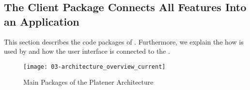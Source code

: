 \documentclass[../ClassicThesis.tex]{subfiles}
\begin{document}





\subsection{The Client Package Connects All Features Into an
  Application}
\label{sec:client-to-application}


This section describes the code packages of {\platener}.
Furthermore, we explain the how {\convertify} is used by
{\platener} and how the user interface is connected to the
.



\begin{figure}
  \texttt{[image: 03-architecture\_overview\_current]}
  \caption{Main Packages of the Platener Architecture}
  \label{fig:architectureOverviewCurrent}
\end{figure}
\end{document}
